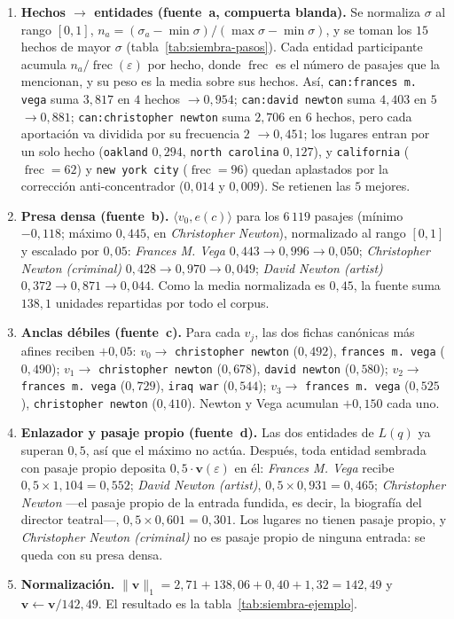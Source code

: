 \documentclass[11pt,a4paper]{article}
\newcommand{\op}[1]{\operatorname{#1}}
\newcommand{\norm}[1]{\lVert #1 \rVert}
\begin{document}
\begin{enumerate}[leftmargin=1.6em, itemsep=2pt]
\item \textbf{Hechos $\to$ entidades (fuente~a, compuerta blanda).} Se
  normaliza $\sigma$ al rango $[0,1]$,
  $n_a=(\sigma_a-\min\sigma)/(\max\sigma-\min\sigma)$, y se toman los
  $15$ hechos de mayor $\sigma$ (tabla~\ref{tab:siembra-pasos}). Cada
  entidad participante acumula $n_a/\op{frec}(\varepsilon)$ por hecho,
  donde $\op{frec}$ es el número de pasajes que la mencionan, y su peso
  es la media sobre sus hechos. Así, \texttt{can:frances m. vega} suma
  $3{,}817$ en $4$ hechos $\to 0{,}954$; \texttt{can:david newton} suma
  $4{,}403$ en $5$ $\to 0{,}881$; \texttt{can:christopher newton} suma
  $2{,}706$ en $6$ hechos, pero cada aportación va dividida por su
  frecuencia $2$ $\to 0{,}451$; los lugares entran por un solo hecho
  (\texttt{oakland} $0{,}294$, \texttt{north carolina} $0{,}127$), y
  \texttt{california} ($\op{frec}=62$) y \texttt{new york city}
  ($\op{frec}=96$) quedan aplastados por la corrección
  anti-concentrador ($0{,}014$ y $0{,}009$). Se retienen las $5$
  mejores.
\item \textbf{Presa densa (fuente~b).} $\langle v_0,e(c)\rangle$ para los
  $6\,119$ pasajes (mínimo $-0{,}118$; máximo $0{,}445$, en
  \emph{Christopher Newton}), normalizado al rango $[0,1]$ y escalado
  por $0{,}05$: \emph{Frances M. Vega} $0{,}443\to0{,}996\to0{,}050$;
  \emph{Christopher Newton (criminal)} $0{,}428\to0{,}970\to0{,}049$;
  \emph{David Newton (artist)} $0{,}372\to0{,}871\to0{,}044$. Como la
  media normalizada es $0{,}45$, la fuente suma $138{,}1$ unidades
  repartidas por todo el corpus.
\item \textbf{Anclas débiles (fuente~c).} Para cada $v_j$, las dos fichas
  canónicas más afines reciben $+0{,}05$: $v_0\to$
  \texttt{christopher newton} ($0{,}492$), \texttt{frances m. vega}
  ($0{,}490$); $v_1\to$ \texttt{christopher newton} ($0{,}678$),
  \texttt{david newton} ($0{,}580$); $v_2\to$ \texttt{frances m. vega}
  ($0{,}729$), \texttt{iraq war} ($0{,}544$); $v_3\to$ \texttt{frances
  m. vega} ($0{,}525$), \texttt{christopher newton} ($0{,}410$). Newton
  y Vega acumulan $+0{,}150$ cada uno.
\item \textbf{Enlazador y pasaje propio (fuente~d).} Las dos entidades de
  $L(q)$ ya superan $0{,}5$, así que el máximo no actúa. Después, toda
  entidad sembrada con pasaje propio deposita
  $0{,}5\cdot\mathbf{v}(\varepsilon)$ en él: \emph{Frances M. Vega}
  recibe $0{,}5\times1{,}104=0{,}552$; \emph{David Newton (artist)},
  $0{,}5\times0{,}931=0{,}465$; \emph{Christopher Newton} ---el pasaje
  propio de la entrada fundida, es decir, la biografía del director
  teatral---, $0{,}5\times0{,}601=0{,}301$. Los lugares no tienen pasaje
  propio, y \emph{Christopher Newton (criminal)} no es pasaje propio de
  ninguna entrada: se queda con su presa densa.
\item \textbf{Normalización.}
  $\norm{\mathbf{v}}_1=2{,}71+138{,}06+0{,}40+1{,}32=142{,}49$ y
  $\mathbf{v}\leftarrow\mathbf{v}/142{,}49$. El resultado es la
  tabla~\ref{tab:siembra-ejemplo}.
\end{enumerate}
\end{document}
